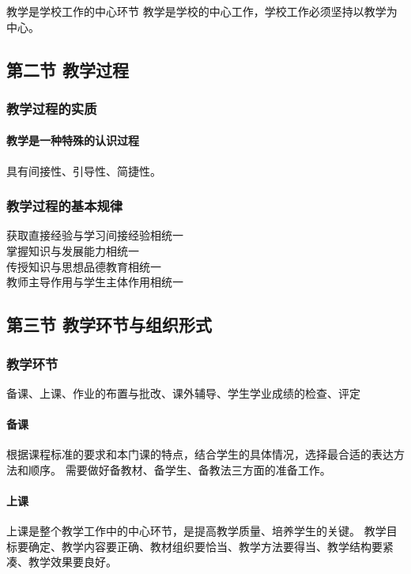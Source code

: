 \documentclass[b5paper,11pt]{article}
\begin{document}
\textcolor{ctp-red}{教学是学校工作的中心环节}
\textcolor{ctp-peach}{教学是学校的中心工作，学校工作必须坚持以教学为中心。}

\subsection{第二节 \space 教学过程}
\subsubsection{教学过程的实质}
\paragraph{教学是一种特殊的认识过程} 具有\textcolor{ctp-red}{间接性、引导性、简捷性}。

\subsubsection{教学过程的基本规律}
\noindent
\textcolor{ctp-red}{
  获取直接经验与学习间接经验相统一 \\
  掌握知识与发展能力相统一 \\
  传授知识与思想品德教育相统一 \\
  教师主导作用与学生主体作用相统一
}

\subsection{第三节 \space 教学环节与组织形式}
\subsubsection{教学环节}
\textcolor{ctp-sky}{备课、上课、作业的布置与批改、课外辅导、学生学业成绩的检查、评定}

\paragraph{备课} 根据课程标准的要求和本门课的特点，结合学生的具体情况，选择最合适的表达方法和顺序。
需要做好\textcolor{ctp-red}{备教材、备学生、备教法}三方面的准备工作。

\paragraph{上课} 上课是整个教学工作中的中心环节，是提高教学质量、培养学生的关键。
\textcolor{ctp-red}{教学目标要确定、教学内容要正确、教材组织要恰当、教学方法要得当、教学结构要紧凑、教学效果要良好。}
\end{document}

